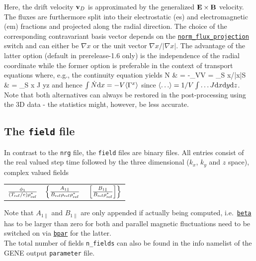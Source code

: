 \documentclass[12pt]{article}
\begin{document}
Here, the drift velocity $\mathbf{v}_D$ is approximated by the generalized $\mathbf{E}\times\mathbf{B}$ velocity.
The fluxes are furthermore split into their electrostatic (es) and electromagnetic (em) fractions and 
projected along the radial direction. The choice of the corresponding contravariant basis vector depends on 
the \hyperlink{norm_flux_projection}{\tt norm\_flux\_projection} switch and can either be 
$\nabla x$ or the unit vector $\nabla x / |\nabla x |$. The advantage of the latter option 
(default in prerelease-1.6 only) is the independence of the radial coordinate while the former 
option is preferable in the context of transport equations where, e.g., the continuity equation yields
\bea
\dot N & = -\int_V\D V = \int_S \mvec{\Gamma}\cdot\nabla x/|\nabla x|\D S \nn \\
 & = \int_S \mvec{\Gamma}\cdot\nabla x J \D y\D z \nn
\eea
and hence $\int \dot N \text{d} x = -V \langle \Gamma^x \rangle$ since $\langle \ldots  \rangle = 1/V \int \ldots J \text{d} x \text{d} y \text{d} z$.
Note that both alternatives can always be restored in the post-processing using the 3D data - the 
statistics might, however, be less accurate.

\subsection{The \texttt{field} file}
\label{subsec:field-file}
In contrast to the \texttt{nrg} file, the \texttt{field} files are binary files.
All entries consist of the real valued step time followed by the three 
dimensional ($k_x$, $k_y$ and $z$ space), complex valued fields
\begin{center}
\begin{tabular}{lll}
$\frac{\phi_1}{(T_{\rm ref}/e)\rho_{\rm ref}^*}$ & 
$\left\{\frac{A_{1\|}}{B_{\rm ref} \rho_{\rm ref} \rho_{\rm ref}^*} \right.$ &
$\left. \left[ \frac{B_{1\|}}{B_{\rm ref} \rho_{\rm ref}^*} \right]\right\}$
\end{tabular}
\end{center}
Note that $A_{1\|}$ and $B_{1\|}$ are only appended if actually being computed, 
i.e.~\hyperlink{beta}{\tt beta} has to be larger than zero for both and 
parallel magnetic fluctuations need to be switched on via \hyperlink{bpar}{\tt bpar} 
for the latter.\\
The total number of fields {\tt n\_fields} can also be found in the info namelist
 of the {\sc GENE} output {\tt parameter} file.
\end{document}
